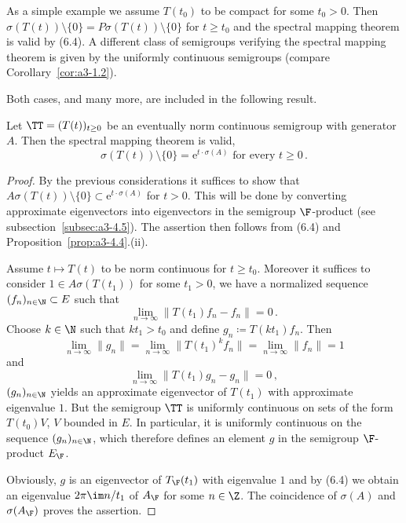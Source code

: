 As a simple example we assume $T(t_{0})$ to be compact for some $t_{0} > 0$.
Then $\sigma(T(t)) \setminus \{0\} = P\sigma(T(t)) \setminus \{0\}$ for $t \geq t_{0}$ and the spectral mapping theorem is valid by (6.4).
A different class of semigroups verifying the spectral mapping theorem is given by the uniformly continuous semigroups (compare Corollary~\ref{cor:a3-1.2}).

Both cases, and many more, are included in the following result.
\begin{theorem}\label{thm:a3-6.6}
Let $\TT = (T(t))_{t\geq 0}$ be an eventually norm continuous semigroup with generator $A$.
Then the spectral mapping theorem is valid, \ie 
\begin{equation}\label{eq:a3-6.6)}
	\sigma(T(t)) \setminus \{0\} = \mathrm{e}^{t \cdot \sigma(A)} \text{ for every } t \geq 0\,.
\end{equation}
\end{theorem}
\begin{proof}
By the previous considerations it suffices to show that $A\sigma(T(t)) \setminus \{0\} \subset \mathrm{e}^{t \cdot \sigma(A)}$ for $t > 0$.
This will be done by converting approximate eigenvectors into eigenvectors in the semigroup $\F$-product (see subsection~\ref{subsec:a3-4.5}).
The assertion then follows from (6.4) and Proposition~\ref{prop:a3-4.4}.(ii).

Assume $t \mapsto T(t)$ to be norm continuous for $t \geq t_{0}$.
Moreover it suffices to consider $1 \in A\sigma(T(t_{1}))$ for some $t_{1} > 0$, \ie we have a normalized sequence $(f_{n})_{n\in\N} \subset E$ such that
\[
\lim_{n\to\infty} \|T(t_{1})f_{n} - f_{n}\| = 0\,.
\]
Choose $k \in \N$ such that $kt_{1} > t_{0}$ and define $g_{n} \coloneqq T(kt_{1})f_{n}$.
Then
\[
\lim_{n\to\infty}\|g_{n}\| = \lim_{n\to\infty}\|T(t_{1})^{k}f_{n}\| = \lim_{n\to\infty}\|f_{n}\| = 1
\]
and
\[
\lim_{n\to\infty} \|T(t_{1})g_{n} - g_{n}\| = 0\,,
\]
\ie $(g_{n})_{n\in\N}$ yields an approximate eigenvector of $T(t_{1})$ with approximate eigenvalue $1$.
But the semigroup $\TT$ is uniformly continuous on sets of the form $T(t_{0})V$, $V$ bounded in $E$.
In particular, it is uniformly continuous on the sequence $(g_{n})_{n\in\N}$, which therefore defines an element $g$ in the semigroup $\F$-product $E_{\F}$.

Obviously, $g$ is an eigenvector of $T_{\F}(t_{1})$ with eigenvalue $1$ and by (6.4) we obtain an eigenvalue $2\pi\im  n/t_{1}$ of $A_{\F}$ for some $n \in \Z$.
The coincidence of $\sigma(A)$ and $\sigma(A_{\F})$ proves the assertion.
\end{proof}
